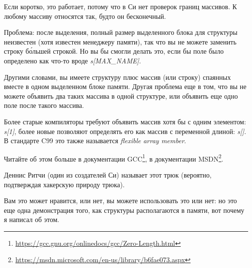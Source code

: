 Если коротко, это работает, потому что в Си нет проверок границ массивов. К любому массиву относятся так, будто он бесконечный.

Проблема: после выделения, полный размер выделенного блока для структуры неизвестен (хотя известен менеджеру памяти),
так что вы не можете заменить строку б\'{о}льшей строкой.
Но вы бы смогли делать это, если бы поле было определено как что-то вроде \emph{s[MAX\_NAME]}.

Другими словами, вы имеете структуру плюс массив (или строку) спаянных вместе в одном выделенном блоке памяти.
Другая проблема еще в том, что вы не можете объявить два таких массива в одной структуре, или объявить еще одно поле
после такого массива.

Более старые компиляторы требуют объявить массив хотя бы с одним элементом: \emph{s[1]}, более новые позволяют
определять его как массив с переменной длиной: \emph{s[]}.
В стандарте C99 это также называется \emph{flexible array member}.

Читайте об этом больше в документации GCC\footnote{\url{https://gcc.gnu.org/onlinedocs/gcc/Zero-Length.html}},
в документации MSDN\footnote{\url{https://msdn.microsoft.com/en-us/library/b6fae073.aspx}}.

Деннис Ритчи (один из создателей Си) называет этот трюк  
(вероятно, подтверждая хакерскую природу трюка).

Вам это может нравится, или нет, вы можете использовать это или нет:
но это еще одна демонстрация того, как структуры располагаются в памяти, вот почему я написал об этом.

